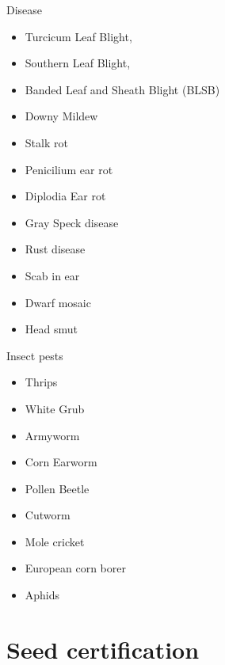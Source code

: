 \documentclass[11pt,dvipsnames,ignorenonframetext,aspectratio=169]{beamer}
\providecommand{\tightlist}{%
  \setlength{\itemsep}{0pt}\setlength{\parskip}{0pt}}
\begin{document}
\begin{frame}{Disease}
\protect\hypertarget{disease}{}

\begin{itemize}
\tightlist
\item
  Turcicum Leaf Blight,
\item
  Southern Leaf Blight,
\item
  Banded Leaf and Sheath Blight (BLSB)
\item
  Downy Mildew
\item
  Stalk rot
\item
  Penicilium ear rot
\item
  Diplodia Ear rot
\item
  Gray Speck disease
\item
  Rust disease
\item
  Scab in ear
\item
  Dwarf mosaic
\item
  Head smut
\end{itemize}

\end{frame}

\begin{frame}{Insect pests}
\protect\hypertarget{insect-pests}{}

\begin{itemize}
\tightlist
\item
  Thrips
\item
  White Grub
\item
  Armyworm
\item
  Corn Earworm
\item
  Pollen Beetle
\item
  Cutworm
\item
  Mole cricket
\item
  European corn borer
\item
  Aphids
\end{itemize}

\end{frame}

\hypertarget{seed-certification}{%
\section{Seed certification}\label{seed-certification}}
\end{document}
